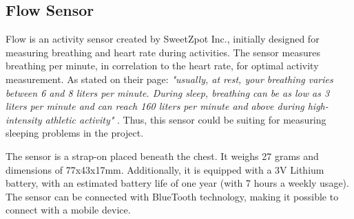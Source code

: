


\subsection{Flow Sensor}
Flow is an activity sensor created by SweetZpot Inc., initially designed for measuring breathing and heart rate during activities. The sensor measures breathing per minute, in correlation to the heart rate, for optimal activity measurement. As stated on their page: \textit{"usually, at rest, your breathing varies between 6 and 8 liters per minute. During sleep, breathing can be as low as 3 liters per minute and can reach 160 liters per minute and above during high-intensity athletic activity"} \cite{flow}. Thus, this sensor could be suiting for measuring sleeping problems in the project.

The sensor is a  strap-on placed beneath the chest. It weighs 27 grams and dimensions of 77x43x17mm. Additionally, it is equipped with a 3V Lithium battery, with an estimated battery life of one year (with 7 hours a weekly usage). The sensor can be connected with BlueTooth technology, making it possible to connect with a mobile device.